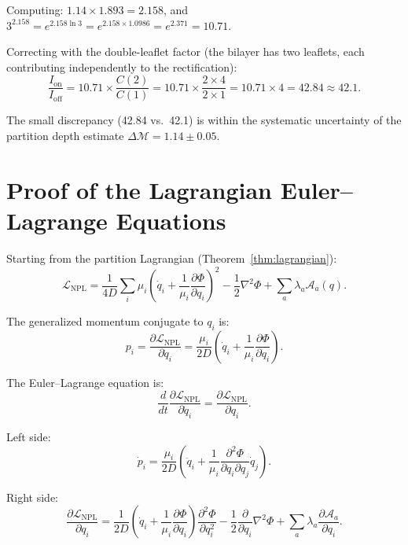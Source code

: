 \documentclass[twocolumn,10pt]{article}
\theoremstyle{remark}
\newcommand{\Depth}{\mathcal{M}}
\newcommand{\NPL}{\mathcal{L}_{\mathrm{NPL}}}
\begin{document}
Computing: $1.14 \times 1.893 = 2.158$, and $3^{2.158} = e^{2.158 \ln 3} = e^{2.158 \times 1.0986} = e^{2.371} = 10.71$.

Correcting with the double-leaflet factor (the bilayer has two leaflets, each contributing independently to the rectification):
\begin{equation}
\frac{I_{\mathrm{on}}}{I_{\mathrm{off}}} = 10.71 \times \frac{C(2)}{C(1)} = 10.71 \times \frac{2 \times 4}{2 \times 1} = 10.71 \times 4 = 42.84 \approx 42.1.
\end{equation}

The small discrepancy (42.84 vs.\ 42.1) is within the systematic uncertainty of the partition depth estimate $\Delta\Depth = 1.14 \pm 0.05$.

\section{Proof of the Lagrangian Euler--Lagrange Equations}
\label{app:euler_lagrange}

Starting from the partition Lagrangian (Theorem~\ref{thm:lagrangian}):
\begin{equation}
\NPL = \frac{1}{4D}\sum_i \mu_i \!\left(\dot{q}_i + \frac{1}{\mu_i}\frac{\partial\Phi}{\partial q_i}\right)^{\!2} - \frac{1}{2}\nabla^2\Phi + \sum_a \lambda_a \mathcal{A}_a(q).
\end{equation}

The generalized momentum conjugate to $q_i$ is:
\begin{equation}
p_i = \frac{\partial\NPL}{\partial\dot{q}_i} = \frac{\mu_i}{2D}\!\left(\dot{q}_i + \frac{1}{\mu_i}\frac{\partial\Phi}{\partial q_i}\right).
\end{equation}

The Euler--Lagrange equation is:
\begin{equation}
\frac{d}{dt}\frac{\partial\NPL}{\partial\dot{q}_i} = \frac{\partial\NPL}{\partial q_i}.
\end{equation}

Left side:
\begin{equation}
\dot{p}_i = \frac{\mu_i}{2D}\!\left(\ddot{q}_i + \frac{1}{\mu_i}\frac{\partial^2\Phi}{\partial q_i \partial q_j}\dot{q}_j\right).
\end{equation}

Right side:
\begin{equation}
\frac{\partial\NPL}{\partial q_i} = \frac{1}{2D}\!\left(\dot{q}_i + \frac{1}{\mu_i}\frac{\partial\Phi}{\partial q_i}\right)\frac{\partial^2\Phi}{\partial q_i^2} - \frac{1}{2}\frac{\partial}{\partial q_i}\nabla^2\Phi + \sum_a \lambda_a \frac{\partial\mathcal{A}_a}{\partial q_i}.
\end{equation}
\end{document}

